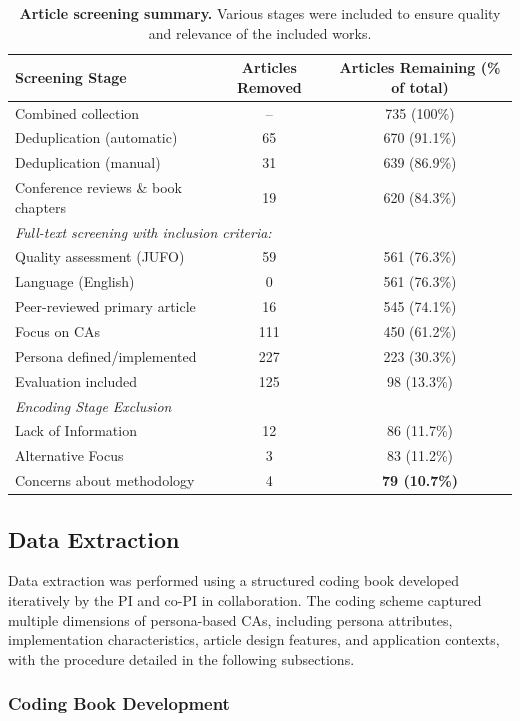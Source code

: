 \documentclass[manuscript,anonymous,sigconf]{acmart}
\begin{document}
\begin{table}[htbp]
\centering
\caption{\textbf{Article screening summary.} Various stages were included to ensure quality and relevance of the included works.}
\label{tab:screening_summary}
\begin{tabular}{lcc}
\hline
\textbf{Screening Stage} & \textbf{Articles Removed} & \textbf{Articles Remaining (\% of total)} \\
\hline
Combined collection & -- & 735 (100\%) \\
Deduplication (automatic) & 65 & 670 (91.1\%) \\
Deduplication (manual) & 31 & 639 (86.9\%) \\
Conference reviews \& book chapters & 19 & 620 (84.3\%) \\
\hline
\multicolumn{3}{l}{\textit{Full-text screening with inclusion criteria:}} \\
Quality assessment (JUFO) & 59 & 561 (76.3\%) \\
Language (English) & 0 & 561 (76.3\%) \\
Peer-reviewed primary article & 16 & 545 (74.1\%) \\
Focus on CAs & 111 & 450 (61.2\%) \\
Persona defined/implemented & 227 & 223 (30.3\%) \\
Evaluation included & 125 & 98 (13.3\%) \\
\hline
\multicolumn{3}{l}{\textit{Encoding Stage Exclusion}} \\
Lack of Information & 12 & 86 (11.7\%) \\
Alternative Focus & 3 & 83 (11.2\%) \\
Concerns about methodology & 4 & \textbf{79 (10.7\%)} \\
\hline
\end{tabular}
\end{table}

\subsection{Data Extraction}

Data extraction was performed using a structured coding book developed iteratively by the PI and co-PI in collaboration. The coding scheme captured multiple dimensions of persona-based CAs, including persona attributes, implementation characteristics, article design features, and application contexts, with the procedure detailed in the following subsections.

\subsubsection{Coding Book Development}
\end{document}
